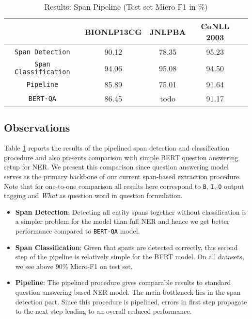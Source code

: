 \begin{table}[h!]
\centering
\begin{tabular}{|c|c|c|c|c|}\hline
	\textbf{} & \textbf{BIONLP13CG} & \textbf{JNLPBA} & \textbf{CoNLL 2003}\\\hline
	\texttt{Span Detection} & 90.12 & 78.35 & 95.23\\\hline
	\texttt{Span Classification} & 94.06 & 95.08 & 94.50\\\hline
	\texttt{Pipeline} & 85.89 & 75.01 & 91.64\\\hline
	\texttt{BERT-QA} & 86.45 & todo & 91.17\\\hline
	\end{tabular}
    \caption{Results: Span Pipeline (Test set Micro-F1 in \%)}
    \label{tab:res_span}
\end{table}

\subsection{Observations}
Table \ref{tab:res_span} reports the results of the pipelined span detection and classification procedure and also presents comparison with simple BERT question answering setup for NER. We present this comparison since question answering model serves as the primary backbone of our current span-based extraction procedure. Note that for one-to-one comparison all results here correspond to \texttt{B}, \texttt{I}, \texttt{O} output tagging and \textit{What} as question word in question formulation.

\begin{itemize}
    \item \textbf{Span Detection}: Detecting all entity spans together without classification is a simpler problem for the model than full NER and hence we get better performance compared to \texttt{BERT-QA} model.
    
    \item \textbf{Span Classification}: Given that spans are detected correctly, this second step of the pipeline is relatively simple for the BERT model. On all datasets, we see above 90\% Micro-F1 on test set.
    
    \item \textbf{Pipeline}: The pipelined procedure gives comparable results to standard question answering based NER model. The main bottleneck lies in the span detection part. Since this procedure is pipelined, errors in first step propagate to the next step leading to an overall reduced performance.
\end{itemize}

